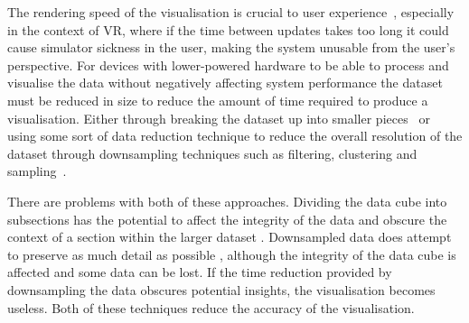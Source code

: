 The rendering speed of the visualisation is crucial to user experience~\cite{MacKenzie1993}, especially in the context of VR, where if the time between updates takes too long it could cause simulator sickness in the user, making the system unusable from the user's perspective. %
For devices with lower-powered hardware to be able to process and visualise the data without negatively affecting system performance the dataset must be reduced in size to reduce the amount of time required to produce a visualisation.
Either through breaking the dataset up into smaller pieces~\cite{Masiane2019, Li2016} or using some sort of data reduction technique to reduce the overall resolution of the dataset through downsampling techniques such as filtering, clustering and sampling~\cite{Masiane2019, Glueck2014}. 

There are problems with both of these approaches.
Dividing the data cube into subsections has the potential to affect the integrity of the data and obscure the context of a section within the larger dataset \cite{Abidi2017}. 
Downsampled data does attempt to preserve as much detail as possible \cite{Dumitrescu2019}, although the integrity of the data cube is affected and some data can be lost.
If the time reduction provided by downsampling the data obscures potential insights, the visualisation becomes useless.
Both of these techniques reduce the accuracy of the visualisation.

